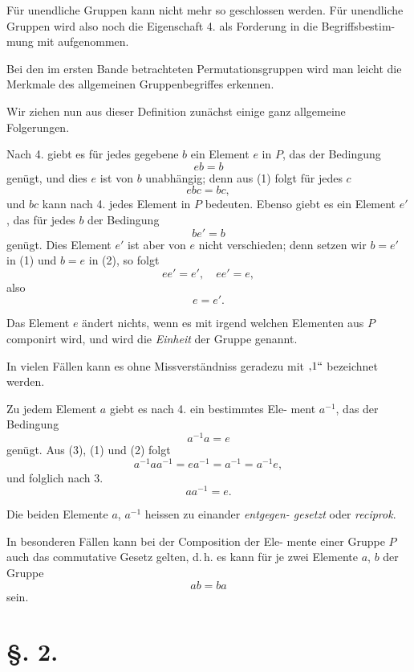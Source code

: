 \documentclass[12pt,a4paper]{article}
\theoremstyle{plain}
\theoremstyle{definition}
\theoremstyle{remark}
\begin{document}
Für unendliche Gruppen kann nicht mehr so geschlossen
werden. Für unendliche Gruppen wird also noch die
Eigenschaft 4. als Forderung in die Begriffsbestim-
mung mit aufgenommen.

\newpage

Bei den im ersten Bande betrachteten Permutationsgruppen
wird man leicht die Merkmale des allgemeinen Gruppenbegriffes
erkennen.

Wir ziehen nun aus dieser Definition zunächst einige ganz
allgemeine Folgerungen.

Nach 4. giebt es für jedes gegebene $b$ ein Element $e$ in $P$,
das der Bedingung
\begin{equation}
eb = b
\end{equation}
genügt, und dies $e$ ist von $b$ unabhängig; denn aus (1) folgt
für jedes $c$
\[
ebc = bc,
\]
und $bc$ kann nach 4. jedes Element in $P$ bedeuten. Ebenso
giebt es ein Element $e'$, das für jedes $b$ der Bedingung
\begin{equation}
be' = b
\end{equation}
genügt. Dies Element $e'$ ist aber von $e$ nicht verschieden; denn
setzen wir $b = e'$ in (1) und $b = e$ in (2), so folgt
\[
ee' = e', \quad ee' = e,
\]
also
\[
e = e'.
\]

Das Element $e$ ändert nichts, wenn es mit irgend welchen
Elementen aus $P$ componirt wird, und wird die \emph{Einheit} der
Gruppe genannt.

In vielen Fällen kann es ohne Missverständniss geradezu
mit $,\!1``$ bezeichnet werden.

Zu jedem Element $a$ giebt es nach 4. ein bestimmtes Ele-
ment $a^{-1}$, das der Bedingung
\begin{equation}
a^{-1}a = e
\end{equation}
genügt. Aus (3), (1) und (2) folgt
\[
a^{-1}aa^{-1} = ea^{-1} = a^{-1} = a^{-1}e,
\]
und folglich nach 3.
\begin{equation}
aa^{-1} = e.
\end{equation}

Die beiden Elemente $a$, $a^{-1}$ heissen zu einander \emph{entgegen-
gesetzt} oder \emph{reciprok}.

In besonderen Fällen kann bei der Composition der Ele-
mente einer Gruppe $P$ auch das commutative Gesetz gelten,
d.\,h. es kann für je zwei Elemente $a$, $b$ der Gruppe
\[
ab = ba
\]
sein.

\newpage

\section*{\S. 2.}
\end{document}
